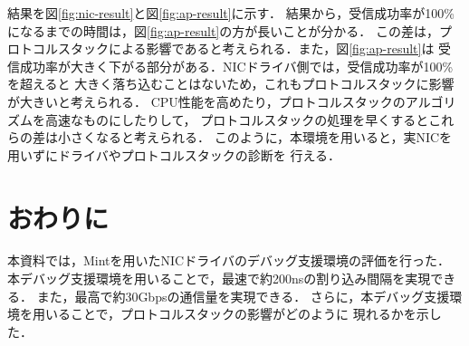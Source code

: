 \documentclass[12pt]{jsarticle}
\begin{document}
結果を図\ref{fig:nic-result}と図\ref{fig:ap-result}に示す．
結果から，受信成功率が100\%になるまでの時間は，図\ref{fig:ap-result}の方が長いことが分かる．
この差は，プロトコルスタックによる影響であると考えられる．また，図\ref{fig:ap-result}は
受信成功率が大きく下がる部分がある．NICドライバ側では，受信成功率が100\%を超えると
大きく落ち込むことはないため，これもプロトコルスタックに影響が大きいと考えられる．
CPU性能を高めたり，プロトコルスタックのアルゴリズムを高速なものにしたりして，
プロトコルスタックの処理を早くするとこれらの差は小さくなると考えられる．
このように，本環境を用いると，実NICを用いずにドライバやプロトコルスタックの診断を
行える．


\section{おわりに}

本資料では，Mintを用いたNICドライバのデバッグ支援環境の評価を行った．
本デバッグ支援環境を用いることで，最速で約200nsの割り込み間隔を実現できる．
また，最高で約30Gbpsの通信量を実現できる．
さらに，本デバッグ支援環境を用いることで，プロトコルスタックの影響がどのように
現れるかを示した．
\end{document}
